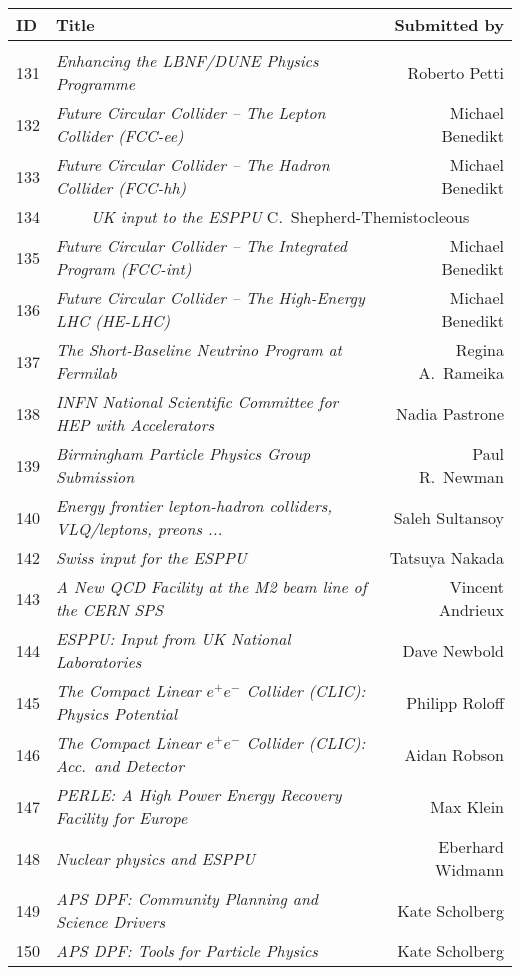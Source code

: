 \newpage
\begin{flushleft}
\begin{tabular}{llr} 
\bf ID & \bf Title & \bf Submitted by \\ \hline 
\vspace*{-3mm} & & \\
131 & \it Enhancing the LBNF/DUNE Physics Programme & Roberto Petti \\
132 & \it Future Circular Collider -- The Lepton Collider (FCC-ee) & Michael Benedikt \\
133 & \it Future Circular Collider -- The Hadron Collider (FCC-hh) & Michael Benedikt \\
134 & \multicolumn{2}{c}{{\it UK input to the ESPPU} \hfill C.\ Shepherd-Themistocleous} \\
135 & \it Future Circular Collider -- The Integrated Program (FCC-int) & Michael Benedikt \\
136 & \it Future Circular Collider -- The High-Energy LHC (HE-LHC) & Michael Benedikt \\
137 & \it The Short-Baseline Neutrino Program at Fermilab & Regina A.\ Rameika \\
138 & \it INFN National Scientific Committee for HEP with Accelerators & Nadia Pastrone \\
139 & \it Birmingham Particle Physics Group Submission & Paul R.\ Newman \\
140 & \it Energy frontier lepton-hadron colliders, VLQ/leptons, preons ... & Saleh Sultansoy \\
142 & \it Swiss input for the ESPPU & Tatsuya Nakada \\
143 & \it A New QCD Facility at the M2 beam line of the CERN SPS & Vincent Andrieux \\
144 & \it ESPPU: Input from UK National Laboratories & Dave Newbold \\
145 & \it The Compact Linear $e^+e^-$ Collider (CLIC): Physics Potential & Philipp Roloff \\
146 & \it The Compact Linear $e^+e^-$ Collider (CLIC): Acc.\ and Detector & Aidan Robson \\
147 & \it PERLE: A High Power Energy Recovery Facility for Europe & Max Klein \\
148 & \it Nuclear physics and ESPPU & Eberhard Widmann \\
149 & \it APS DPF: Community Planning and Science Drivers & Kate Scholberg \\
150 & \it APS DPF: Tools for Particle Physics & Kate Scholberg \\

\end{tabular}
\end{flushleft}
